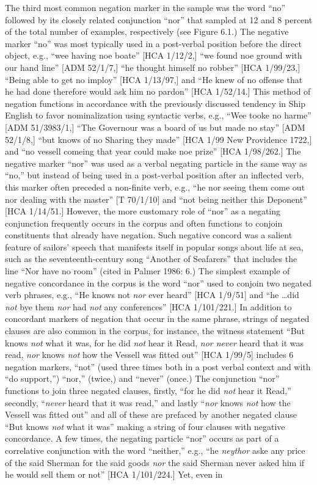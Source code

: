 \documentclass[12pt]{article}
\newenvironment{styleStandard}{\renewcommand\baselinestretch{1.0}\setlength\leftskip{0cm}\setlength\rightskip{0cm plus 1fil}\setlength\parindent{0cm}\setlength\parfillskip{0pt plus 1fil}\setlength\parskip{0in plus 1pt}\writerlistparindent\writerlistleftskip\leavevmode\normalfont\normalsize\writerlistlabel\ignorespaces}{\unskip\vspace{0in plus 1pt}\par}
\newcommand\writerlistleftskip{}
\newcommand\writerlistparindent{}
\newcommand\writerlistlabel{}
\begin{document}
\begin{styleStandard}
The third most common negation marker in the sample was the word “no” followed by its closely related conjunction “nor” that sampled at 12 and 8 percent of the total number of examples, respectively (see Figure 6.1.) The negative marker “no” was most typically used in a post-verbal position before the direct object, e.g., “wee having noe boate” [HCA 1/12/2,] “we found noe ground with our hand line” [ADM 52/1/7,] “he thought himself no robber” [HCA 1/99/23,] “Being able to get no imploy” [HCA 1/13/97,] and “He knew of no offense that he had done therefore would ask him no pardon” [HCA 1/52/14.] This method of negation functions in accordance with the previously discussed tendency in Ship English to favor nominalization using syntactic verbs, e.g., “Wee tooke no harme” [ADM 51/3983/1,] “The Governour was a board of us but made no stay” [ADM 52/1/8,] “but knows of no Sharing they made” [HCA 1/99 New Providence 1722,] and “no vessell comeing that year could make noe prize” [HCA 1/98/262.] The negative marker “nor” was used as a verbal negating particle in the same way as “no,” but instead of being used in a post-verbal position after an inflected verb, this marker often preceded a non-finite verb, e.g., “he nor seeing them come out nor dealing with the master” [T 70/1/10] and “not being neither this Deponent” [HCA 1/14/51.] However, the more customary role of “nor” as a negating conjunction frequently occurs in the corpus and often functions to conjoin constituents that already have negation. Such negative concord was a salient feature of sailors’ speech that manifests itself in popular songs about life at sea, such as the seventeenth-century song “Another of Seafarers” that includes the line “Nor have no room” (cited in Palmer 1986: 6.) The simplest example of negative concordance in the corpus is the word “nor” used to conjoin two negated verb phrases, e.g., “He knows\textit{ }not \textit{nor} ever heard” [HCA 1/9/51] and “he …did \textit{not} bye them \textit{nor} had\textit{ not} any conferences” [HCA 1/101/221.] In addition to concordant markers of negation that occur in the same phrase, strings of negated clauses are also common in the corpus, for instance, the witness statement “But knows\textit{ not} what it was, for he did\textit{ not} hear it Read, \textit{nor never} heard that it was read, \textit{nor} knows\textit{ not} how the Vessell was fitted out” [HCA 1/99/5] includes 6 negation markers, “not” (used three times both in a post verbal context and with “do support,”) “nor,” (twice,) and “never” (once.) The conjunction “nor” functions to join three negated clauses, firstly, “for he did\textit{ not} hear it Read,” secondly, “\textit{never} heard that it was read,” and lastly “\textit{nor} knows\textit{ not} how the Vessell was fitted out” and all of these are prefaced by another negated clause “But knows\textit{ not} what it was” making a string of four clauses with negative concordance. A few times, the negating particle “nor” occurs as part of a correlative conjunction with the word “neither,” e.g., “he \textit{neythor} aske any price of the said Sherman for the said goods \textit{nor }the said Sherman never asked him if he would sell them or not” [HCA 1/101/224.] Yet, even in 
\end{styleStandard}
\end{document}
